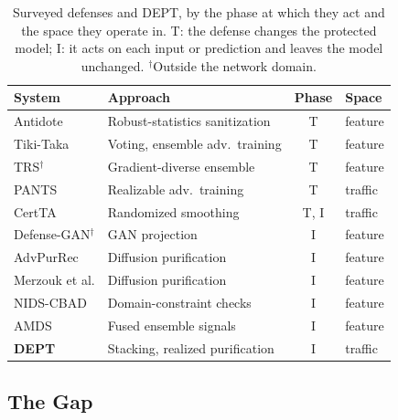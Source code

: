 \documentclass[acmtog,nonacm,pbalance]{acmart}
\begin{document}
\begin{table}[t]
  \caption{Surveyed defenses and DEPT, by the phase at which they act and the
  space they operate in. T: the defense changes the protected model; I: it
  acts on each input or prediction and leaves the model unchanged.
  $^\dagger$Outside the network domain.}
  \label{tab:related}
  \footnotesize
  \begin{tabular}{@{}llcl@{}}
    \toprule
    System & Approach & Phase & Space \\
    \midrule
    Antidote & Robust-statistics sanitization & T & feature \\
    Tiki-Taka & Voting, ensemble adv.\ training & T & feature \\
    TRS$^\dagger$ & Gradient-diverse ensemble & T & feature \\
    PANTS & Realizable adv.\ training & T & traffic \\
    CertTA & Randomized smoothing & T, I & traffic \\
    Defense-GAN$^\dagger$ & GAN projection & I & feature \\
    AdvPurRec & Diffusion purification & I & feature \\
    Merzouk et al. & Diffusion purification & I & feature \\
    NIDS-CBAD & Domain-constraint checks & I & feature \\
    AMDS & Fused ensemble signals & I & feature \\
    \midrule
    \textbf{DEPT} & Stacking, realized purification & I & traffic \\
    \bottomrule
  \end{tabular}
\end{table}

\subsection{The Gap}
\end{document}
